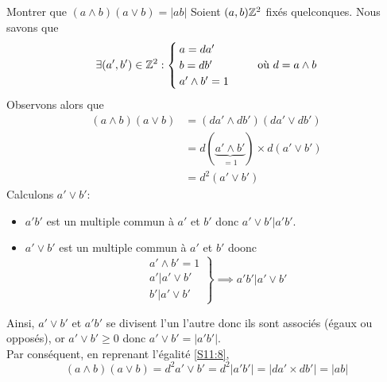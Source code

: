 \documentclass{article}
\begin{document}
\begin{question_kholle}{Montrer que $(a\land b)(a\lor b) = |ab|$}
	Soient $(a,b)\if\Z^{2}$ fixés quelconques. Nous savons que
	\[
		\exists (a', b')\in\mathbb Z^{2}:
		\begin{cases}
			a=da' \\
			b=db' \\
			a'\land b'=1
		\end{cases} \quad \text{ où } d=a\land b
	\]
	Observons alors que
	\begin{align}
		(a\land b)(a\lor b) & =(da'\land db')(da'\lor db')
		\nonumber
		\\
		                    & = d(\underbrace{a'\land b'}_{=1})\times d(a'\lor b') \nonumber \\
		                    & = d^{2}(a'\lor b') \label{S11:8}\tag{$\star$}
	\end{align}
	Calculons $a'\lor b'$:
	\begin{itemize}
		\item $a' b'$ est un multiple commun à $a'$ et $b'$ donc $a'\lor b'
			      \vert a' b'$.
		\item $a'\lor b'$ est un multiple commun à $a'$ et $b'$ doonc
		      \[
			      \left.
			      \begin{array}{l}
				      a'\land b'=1       \\
				      a' \vert a'\lor b' \\
				      b' \vert a'\lor b'
			      \end{array}\right\} \implies  a' b' \vert a'\lor b'
		      \]
	\end{itemize}
	Ainsi, $a'\lor b'$ et $a' b'$ se divisent l’un l’autre donc ils sont
	associés (égaux ou opposés), or $a'\lor b'\geq 0$ donc $a'\lor b'=|a' b'|$.\\
	Par conséquent, en reprenant l’égalité \eqref{S11:8},
	\[
		(a\land b)(a\lor b) = d^{2}a' \lor b' = d^{2} |a' b'| = |da' \times
		db'| = |ab|
	\]

\end{question_kholle}
\end{document}
